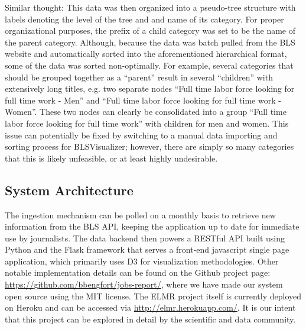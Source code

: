 \documentclass[journal]{IEEEtran}
\newcommand\Peter[1]{{\color{red}#1}}	%
\newcommand\Ben[1]{{\color{blue}#1}}		%
\begin{document}
Similar thought: 
\Peter{This data was then organized into a pseudo-tree structure with labels denoting the level of the tree and and name of its category. For proper organizational purposes, the prefix of a child category was set to be the name of the parent category. Although, because the data was batch pulled from the BLS website and automatically sorted into the aforementioned hierarchical format, some of the data was sorted non-optimally. For example, several categories that should be grouped together as a ``parent'' result in several ``children'' with extensively long titles, e.g. two separate nodes ``Full time labor force looking for full time work - Men'' and ``Full time labor force looking for full time work - Women''. These two nodes can clearly be consolidated into a group ``Full time labor force looking for full time work'' with children for men and women. This issue can potentially be fixed by switching to a manual data importing and sorting process for BLSVisualizer; however, there are simply so many categories that this is likely unfeasible, or at least highly undesirable.  }

\subsection{System Architecture}

\Ben{The ingestion mechanism can be polled on a monthly basis to retrieve new information from the BLS API, keeping the application up to date for immediate use by journalists. The data backend then powers a RESTful API built using Python and the Flask framework that serves a front-end javascript single page application, which primarily uses D3 for visualization methodologies. Other notable implementation details can be found on the Github project page: \url{https://github.com/bbengfort/jobs-report/}, where we have made our system open source using the MIT license. The ELMR project itself is currently deployed on Heroku and can be accessed via \url{http://elmr.herokuapp.com/}. It is our intent that this project can be explored in detail by the scientific and data community.}
\end{document}
